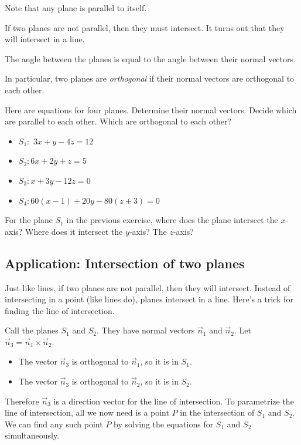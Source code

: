 Note that any plane is parallel to itself.

\begin{framed}
    If two planes are not parallel, then they must intersect. It turns out that they will intersect in a line.
    \bigskip

    The angle between the planes is equal to the angle between their normal vectors.
    \bigskip

    In particular, two planes are \emph{orthogonal} if their normal vectors are orthogonal to each other.
\end{framed}

\vspace{1.3in}

\begin{ex}
    Here are equations for four planes. Determine their normal vectors. Decide which are parallel to each other. Which are orthogonal to each other? %
	\begin{multicols}{2}
    \begin{itemize}
    	\item $S_1:$ $3x+y-4z=12$ 
    	\item $S_2: 6x+2y+z=5$ 
    	\item $S_3: x+3y-12z=0$
    	\item $S_4: 60(x-1)+20y-80(z+3)=0$
    \end{itemize}
    \end{multicols}
\end{ex}

\vfill

\begin{ex}
    For the plane $S_1$ in the previous exercise, where does the plane intersect the $x$-axis? Where does it intersect the $y$-axis? The $z$-axis?
\end{ex}

\vfill

\pagebreak

\subsection{Application: Intersection of two planes}
Just like lines, if two planes are not parallel, then they will intersect. Instead of intersecting in a point (like lines do), planes intersect in a line. Here's a trick for finding the line of intersection.

Call the planes $S_1$ and $S_2$. They have normal vectors $\vec{n}_1$ and $\vec{n}_2$. Let $\vec{n}_3=\vec{n}_1\times\vec{n}_2$.
\begin{itemize}
    \item The vector $\vec{n}_3$ is orthogonal to $\vec{n}_1$, so it is in $S_1$. 
    \item The vector $\vec{n}_3$ is orthogonal to $\vec{n}_2$, so it is in $S_2$.
\end{itemize}
Therefore $\vec{n}_3$ is a direction vector for the line of intersection. To parametrize the line of intersection, all we now need is a point $P$ in the intersection of $S_1$ and $S_2$. We can find any such point $P$ by solving the equations for $S_1$ and $S_2$ simultaneously.

